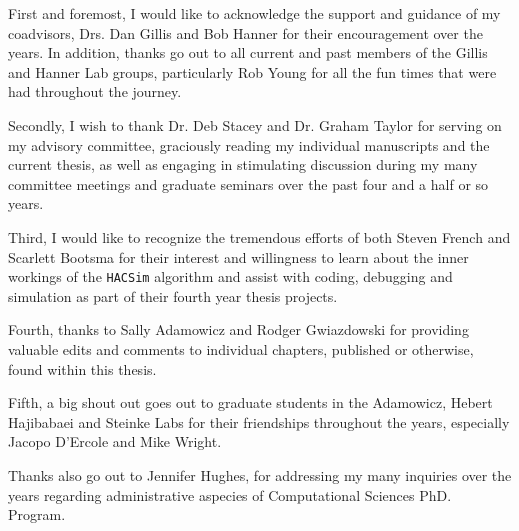 \begin{acknowledgements}\label{acknow}
\ssp

\noindent First and foremost, I would like to acknowledge the support and guidance of my \\ coadvisors, Drs. Dan Gillis and Bob Hanner for their encouragement over the years. In addition, thanks go out to all current and past members of the Gillis and Hanner Lab groups, particularly Rob Young for all the fun times that were had throughout the journey.

\vspace{5mm}

\noindent Secondly, I wish to thank Dr. Deb Stacey and Dr. Graham Taylor for serving on my advisory committee, graciously reading my individual manuscripts and the current thesis, as well as engaging in stimulating discussion during my many committee meetings and graduate seminars over the past four and a half or so years.

\vspace{5mm}

\noindent Third, I would like to recognize the tremendous efforts of both Steven French and Scarlett Bootsma for their interest and willingness to learn about the inner workings of the {\tt HACSim} algorithm and assist with coding, debugging and simulation as part of their fourth year thesis projects.

\vspace{5mm}

\noindent Fourth, thanks to Sally Adamowicz and Rodger Gwiazdowski for providing \\ valuable edits and comments to individual chapters, published or otherwise, found within this thesis.

\vspace{5mm}

\noindent Fifth, a big shout out goes out to graduate students in the Adamowicz, Hebert \\ Hajibabaei and Steinke Labs for their friendships throughout the years, especially Jacopo D'Ercole and Mike Wright.

\vspace{5mm}

\noindent Thanks also go out to Jennifer Hughes, for addressing my many inquiries over the years regarding administrative aspecies of Computational Sciences PhD. Program.

\vspace{5mm}


\end{acknowledgements}
